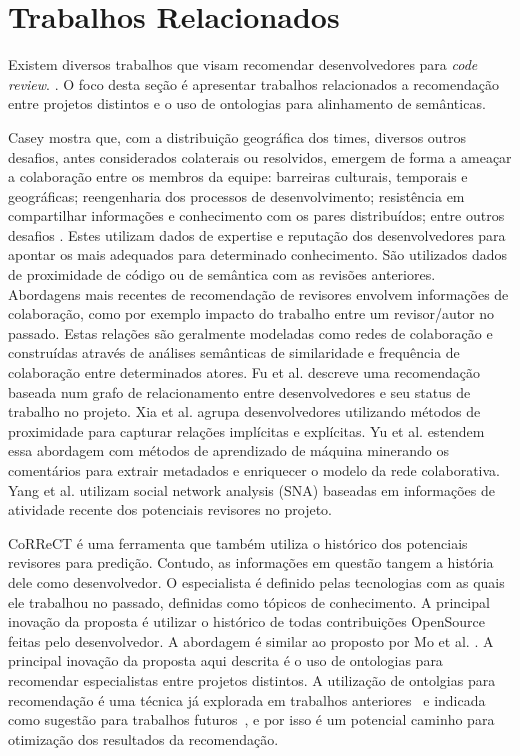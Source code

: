 \documentclass[sigconf]{acmart}
\begin{document}
\section{Trabalhos Relacionados}


Existem diversos trabalhos que visam recomendar desenvolvedores para \textit{code review}.  \cite{yu2014,yu2014-2,Xia2015261,jiang2017,fu2017,xia2017,yang2016}. O foco desta seção é apresentar trabalhos relacionados a recomendação entre projetos distintos e o uso de ontologias para alinhamento de semânticas.

Casey \cite{casey2010} mostra que, com a distribuição geográfica dos times, diversos outros desafios, antes considerados colaterais ou resolvidos, emergem de forma a ameaçar a colaboração entre os membros da equipe: barreiras culturais, temporais e geográficas; reengenharia dos processos de desenvolvimento; resistência em compartilhar informações e conhecimento com os pares distribuídos; entre outros desafios \cite{pimentel2008, silva2009}. Estes utilizam dados de expertise e reputação dos desenvolvedores para apontar os mais adequados para determinado conhecimento. São utilizados dados de proximidade de código ou de semântica com as revisões anteriores. Abordagens mais recentes de recomendação de revisores envolvem informações de colaboração, como por exemplo impacto do trabalho entre um revisor/autor no passado. Estas relações são geralmente modeladas como redes de colaboração e construídas através de análises semânticas de similaridade e frequência de colaboração entre determinados atores. Fu et al. \cite{fu2017} descreve uma recomendação baseada num grafo de relacionamento entre desenvolvedores e seu status de trabalho no projeto. Xia et al. \cite{xia2017} agrupa desenvolvedores utilizando métodos de proximidade para capturar relações implícitas e explícitas. Yu et al. \cite{yu2014,yu2014-2} estendem essa abordagem com métodos de aprendizado de máquina minerando os comentários para extrair metadados e enriquecer o modelo da rede colaborativa. Yang et al. \cite{yang2016} utilizam social network analysis (SNA) baseadas em informações de atividade recente dos potenciais revisores no projeto.

CoRReCT \cite{rahman2016} é uma ferramenta que também utiliza o histórico dos potenciais revisores para predição. Contudo, as informações em questão tangem a história dele como desenvolvedor. O especialista é definido pelas tecnologias com as quais ele trabalhou no passado, definidas como tópicos de conhecimento. A principal inovação da proposta é utilizar o histórico de todas contribuições OpenSource feitas pelo desenvolvedor. A abordagem é similar ao proposto por Mo et al. \cite{mo2015}. A principal inovação da proposta aqui descrita é o uso de ontologias para recomendar especialistas entre projetos distintos. A utilização de ontolgias para recomendação é uma técnica já explorada em trabalhos anteriores~\cite{middleton2001,middleton2004} e indicada como sugestão para trabalhos futuros~\cite{adomavicius2005}, e por isso é um potencial caminho para otimização dos resultados da recomendação.
\end{document}

